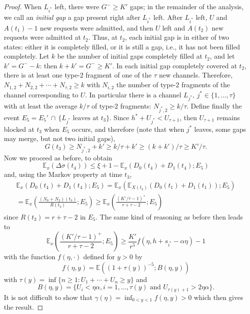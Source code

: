 \documentclass{amsart}
\def\E{\mathbb{E}}
\begin{document}
\begin{proof}
When $L_{i^*}$ left, there were $G^- \geq K'$ gaps; in the remainder
of the analysis, we call an \emph{initial gap} a gap present right
after $L_{i^*}$ left. After $L_{i^*}$ left, $U$ and $A(t_1) - 1$ new
requests were admitted, and then $U$ left and $A(t_2)$ new requests
were admitted at $t_2$. Thus, at $t_2$, each initial gap is in
either of two states: either it is completely filled, or it is still
a gap, i.e., it has not been filled completely. Let $k$ be the
number of initial gaps completely filled at $t_2$, and let $k' = G^-
- k$: then $k + k' = G^- \geq K'.$ In each initial gap completely
covered at $t_2$, there is at least one type-$2$ fragment of one of
the $\tau$ new channels. Therefore,
    $ N_{1, 2} + N_{2, 2} + \cdots + N_{\tau, 2} \geq k $
with $N_{i,2}$ the number of type-$2$ fragments of the channel corresponding to $U$.
In particular there is a channel $L_{j^*},~ j^* \in \{ 1, \ldots,
\tau \}$ with at least the average $k / \tau$ of type-$2$ fragments:
$N_{j^*, 2} \geq k / \tau$. Define finally the event $E_5 = E_5' \,
\cap \, \{ L_{j^*} \text{ leaves at } t_3 \}.$ Since $h^* + U_{j^*}
< U_{\tau + 1}$, then $U_{\tau + 1}$ remains blocked at $t_3$ when
$E_5$ occurs, and therefore (note that when $j^*$ leaves, some gaps
may merge, but not two initial gaps),
    \[ G(t_3) \geq N_{j^*, 2} + k' \geq k / \tau + k' \geq (k + k') / \tau \geq K' / \tau. \]
Now we proceed as before, to obtain
    \[ \E_x(\Delta \sigma(t_4)) \leq \xi + 1 - \E_x(D_0(t_4) + D_1(t_4) ; E_5) \]
and, using the Markov property at time $t_3$,
\begin{multline*}
    \E_x(D_0(t_4) + D_1(t_4) ; E_5) = \E_x( \E_{X(t_3)} (D_0(t_1) + D_1(t_1)) ; E_5)\\
    = \E_x \left( \frac{(N_0 + N_2)(t_3)}{R(t_3)} ; E_5 \right)
    \geq \E_x \left( \frac{(K' / \tau - 1)^+}{r + \tau - 2} ; E_5 \right)
\end{multline*}
since $R(t_3) = r + \tau - 2$ in $E_5$. The same kind of reasoning
as before then leads to
\[
    \E_x \left( \frac{(K' / \tau - 1)^+}{r + \tau - 2} ; E_5 \right)
    \geq \frac{K'}{r^5} f(\eta, h + s_{i^*} - \alpha \eta) - 1
\]
with the function $f(\eta, \cdot)$ defined for $y > 0$ by
\[ f(\eta, y) = \E \left((1 + \tau(y))^{-5} ; B(\eta, y) \right) \]
with $\tau(y) = \inf\{n \geq 1: U_1 + \cdots + U_n \geq y\}$ and
\[ B(\eta, y) = \{ U_i < \eta \alpha, i = 1, \ldots, \tau(y)
\text{ and } U_{\tau(y)+1} > 2 \eta \alpha \}. \] It is not
difficult to show that
    $ \gamma(\eta) = \inf_{0 < y < 1} f(\eta, y) > 0 $
which then gives the result.



\end{proof}
\end{document}
